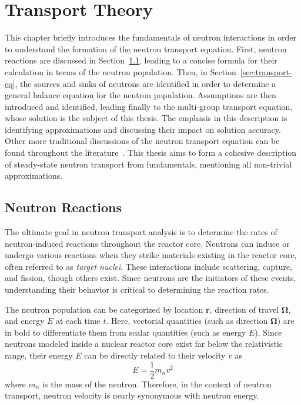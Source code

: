 \chapter{Transport Theory}
\label{chap:transport}

This chapter briefly introduces the fundamentals of neutron interactions in order to understand the formation of the neutron transport equation. First, neutron reactions are discussed in Section~\ref{sec:transport-fundamentals}, leading to a concise formula for their calculation in terms of the neutron population. Then, in Section~\ref{sec:transport-eq}, the sources and sinks of neutrons are identified in order to determine a general balance equation for the neutron population. Assumptions are then introduced and identified, leading finally to the multi-group transport equation, whose solution is the subject of this thesis. The emphasis in this description is identifying approximations and discussing their impact on solution accuracy. Other more traditional discussions of the neutron transport equation can be found throughout the literature~\cite{henry, duderstadt, duderstadt-martin, bell1967transport, hebert2009applied}. This thesis aims to form a cohesive description of steady-state neutron transport from fundamentals, mentioning all non-trivial approximations.

\section{Neutron Reactions}
\label{sec:transport-fundamentals}

The ultimate goal in neutron transport analysis is to determine the rates of neutron-induced reactions throughout the reactor core. Neutrons can induce or undergo various reactions when they strike materials existing in the reactor core, often referred to as \textit{target nuclei}. These interactions include scattering, capture, and fission, though others exist. Since neutrons are the initiators of these events, understanding their behavior is critical to determining the reaction rates.

The neutron population can be categorized by location $\mathbf{r}$, direction of travel $\mathbf{\Omega}$, and energy $E$ at each time $t$. Here, vectorial quantities (such as direction $\mathbf{\Omega}$) are in bold to differentiate them from scalar quantities (such as energy $E$). Since neutrons modeled inside a nuclear reactor core exist far below the relativistic range, their energy $E$ can be directly related to their velocity $v$ as
\begin{equation}
E = \frac{1}{2} m_n v^2
\end{equation}
where $m_n$ is the mass of the neutron. Therefore, in the context of neutron transport, neutron velocity is nearly synonymous with neutron energy.

